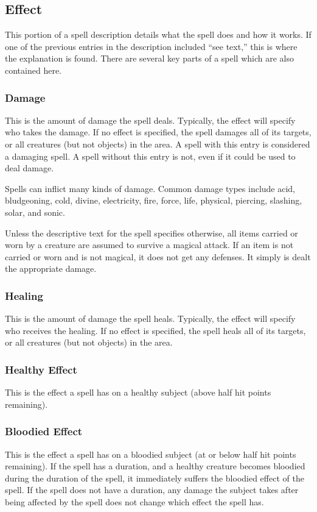 \subsection{Effect}
This portion of a spell description details what the spell does and how it works. If one of the previous entries in the description included ``see text,'' this is where the explanation is found. There are several key parts of a spell which are also contained here.

\subsubsection{Damage}
This is the amount of damage the spell deals. Typically, the effect will specify who takes the damage. If no effect is specified, the spell damages all of its targets, or all creatures (but not objects) in the area. A spell with this entry is considered a damaging spell. A spell without this entry is not, even if it could be used to deal damage.

Spells can inflict many kinds of damage. Common damage types include acid, bludgeoning, cold, divine, electricity, fire, force, life, physical, piercing, slashing, solar, and sonic.

 Unless the descriptive text for the spell specifies otherwise, all items carried or worn by a creature are assumed to survive a magical attack. If an item is not carried or worn and is not magical, it does not get any defenses. It simply is dealt the appropriate damage.

\subsubsection{Healing}
This is the amount of damage the spell heals. Typically, the effect will specify who receives the healing. If no effect is specified, the spell heals all of its targets, or all creatures (but not objects) in the area.

\subsubsection{Healthy Effect}
This is the effect a spell has on a healthy subject (above half hit points remaining).

\subsubsection{Bloodied Effect}
This is the effect a spell has on a bloodied subject (at or below half hit points remaining). If the spell has a duration, and a healthy creature becomes bloodied during the duration of the spell, it immediately suffers the bloodied effect of the spell. If the spell does not have a duration, any damage the subject takes after being affected by the spell does not change which effect the spell has.


